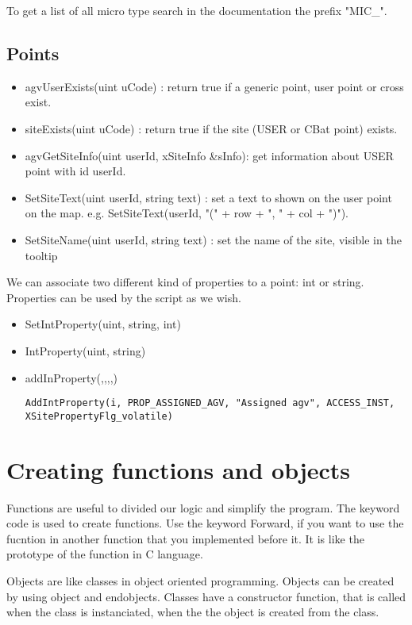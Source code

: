 To get a list of all micro type search in the documentation the prefix "{MIC\_}".

\subsection{Points}

\begin{itemize}
	\item agvUserExists(uint uCode) : return true if a generic point, user point or cross exist.
	\item siteExists(uint uCode) : return true if the site (USER or CBat point) exists.
	\item agvGetSiteInfo(uint userId, xSiteInfo \&sInfo): get information about USER point with id userId.
	\item SetSiteText(uint userId, string text) : set a text to shown on the user point on the map. e.g. SetSiteText(userId, "(" + row + ", " + col + ")").
	\item SetSiteName(uint userId, string text) : set the name of the site, visible in the tooltip\\
\end{itemize}

We can associate two different kind of properties to a point: int or string. Properties can be used by the script as we wish.
\begin{itemize}
	\item SetIntProperty(uint, string, int)
	\item IntProperty(uint, string)
	\item addInProperty(,,,,)
	\begin{lstlisting}[frame=none]
	AddIntProperty(i, PROP_ASSIGNED_AGV, "Assigned agv", ACCESS_INST, XSitePropertyFlg_volatile)
	\end{lstlisting}
\end{itemize}	

%
\section{Creating functions and objects}
Functions are useful to divided our logic and simplify the program. The keyword code is used to create functions.
Use the keyword Forward, if you want to use the fucntion in another function that you implemented before it. It is like the prototype of the function in C language.
 
Objects are like classes in object oriented programming. Objects can be created by using object and endobjects.
Classes have a constructor function, that is called when the class is instanciated, when the the object is created from the class.

